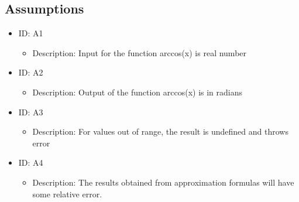 \documentclass[12pt]{report}
\begin{document}
\subsection{Assumptions}
\begin{itemize}
\item ID: A1
\begin{itemize}
\item Description: Input for the function arccos(x) is real number
\end{itemize}
\item ID: A2
\begin{itemize}
\item Description: Output of the function arccos(x) is in radians\degree
\end{itemize}
\item ID: A3
\begin{itemize}
\item Description: For values out of range, the result is undefined and throws error
\end{itemize}
\item ID: A4
\begin{itemize}
\item Description: The results obtained from approximation formulas will have some relative error.
\end{itemize}
\end{itemize}
\end{document}
